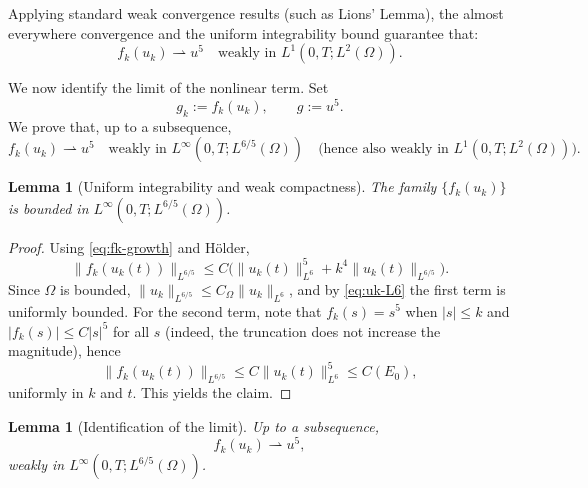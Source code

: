 \documentclass[11pt,letterpaper]{amsart}
\newtheorem{lemma}[theorem]{Lemma}
\begin{document}
Applying standard weak convergence results (such as Lions' Lemma), the almost everywhere convergence and the uniform integrability bound guarantee that:
\begin{equation}
f_k(u_k) \rightharpoonup u^5 \quad \text{weakly in } L^1(0,T; L^2(\Omega)).
\end{equation}

We now identify the limit of the nonlinear term.
Set
\[
g_k := f_k(u_k),\qquad g := u^5.
\]
We prove that, up to a subsequence,
\begin{equation}\label{eq:fk-weak-limit}
f_k(u_k)\rightharpoonup u^5 \quad\text{weakly in } L^\infty(0,T;L^{6/5}(\Omega))
\quad\text{(hence also weakly in }L^1(0,T;L^2(\Omega))\text{).}
\end{equation}

\begin{lemma}[Uniform integrability and weak compactness]\label{lem:fk-bounded}
The family $\{f_k(u_k)\}$ is bounded in $L^\infty(0,T;L^{6/5}(\Omega))$.
\end{lemma}

\begin{proof}
Using \eqref{eq:fk-growth} and H\"older,
\[
\|f_k(u_k(t))\|_{L^{6/5}}
\le C\big(\|u_k(t)\|_{L^6}^5 + k^4\|u_k(t)\|_{L^{6/5}}\big).
\]
Since $\Omega$ is bounded, $\|u_k\|_{L^{6/5}}\le C_\Omega\|u_k\|_{L^6}$, and by
\eqref{eq:uk-L6} the first term is uniformly bounded.
For the second term, note that $f_k(s)=s^5$ when $|s|\le k$ and
$|f_k(s)|\le C|s|^5$ for all $s$ (indeed, the truncation does not increase the magnitude),
hence
\[
\|f_k(u_k(t))\|_{L^{6/5}} \le C\|u_k(t)\|_{L^6}^5 \le C(E_0),
\]
uniformly in $k$ and $t$. This yields the claim.
\end{proof}

\begin{lemma}[Identification of the limit]\label{lem:fk-limit}
Up to a subsequence, $$f_k(u_k)\rightharpoonup u^5,$$ weakly in
$L^\infty(0,T;L^{6/5}(\Omega))$.
\end{lemma}
\end{document}
